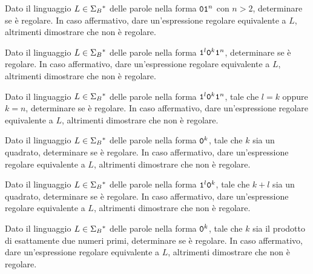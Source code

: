 \begin{Exercise}\label{exe:pump-011+}
Dato il linguaggio $L\in\Sigma_{B}{}^{\ast}$ delle parole nella forma $\mathtt{0}\mathtt{1}^{n}$ con $n > 2$, determinare se è
regolare.
In  caso affermativo, dare un'espressione regolare equivalente a $L$, altrimenti dimostrare che non è regolare.
\end{Exercise}

\begin{Exercise}\label{exe:pump-1l0k1n}
Dato il linguaggio $L\in\Sigma_{B}{}^{\ast}$ delle parole nella forma $\mathtt{1}^{l}\mathtt{0}^{k}\mathtt{1}^{n}$, determinare se è
regolare.
In  caso affermativo, dare un'espressione regolare equivalente a $L$, altrimenti dimostrare che non è regolare.
\end{Exercise}

\begin{Exercise}\label{exe:pump-1l0k1n}
Dato il linguaggio $L\in\Sigma_{B}{}^{\ast}$ delle parole nella forma $\mathtt{1}^{l}\mathtt{0}^{k}\mathtt{1}^{n}$, tale che $l=k$ oppure $k=n$,
determinare se è
regolare.
In  caso affermativo, dare un'espressione regolare equivalente a $L$, altrimenti dimostrare che non è regolare.
\end{Exercise}


\begin{Exercise}\label{exe:pump-0square}
Dato il linguaggio $L\in\Sigma_{B}{}^{\ast}$ delle parole nella forma $\mathtt{0}^{k}$, tale che $k$ sia un quadrato,
determinare se è
regolare.
In  caso affermativo, dare un'espressione regolare equivalente a $L$, altrimenti dimostrare che non è regolare.
\end{Exercise}

\begin{Exercise}\label{exe:pump-01square}
Dato il linguaggio $L\in\Sigma_{B}{}^{\ast}$ delle parole nella forma $\mathtt{1}^{l}\mathtt{0}^{k}$, tale che $k+l$ sia un quadrato,
determinare se è
regolare.
In  caso affermativo, dare un'espressione regolare equivalente a $L$, altrimenti dimostrare che non è regolare.
\end{Exercise}

\begin{Exercise}\label{exe:pump-0prodotto2primi}
Dato il linguaggio $L\in\Sigma_{B}{}^{\ast}$ delle parole nella forma $\mathtt{0}^{k}$, tale che $k$ sia il prodotto di
esattamente due numeri primi,
determinare se è regolare.
In  caso affermativo, dare un'espressione regolare equivalente a $L$, altrimenti dimostrare che non è regolare.
\end{Exercise}



